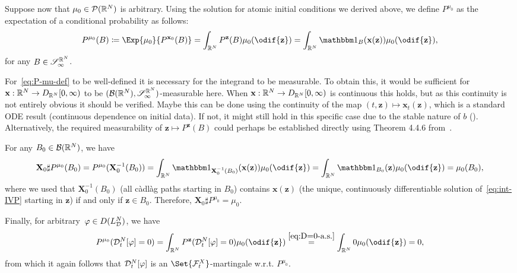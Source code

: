 Suppose now that \( \mu_0 \in \mathcal{P}(\mathbb{R}^N) \) is arbitrary.
Using the solution for atomic initial conditions we derived above, we define \( P^{\mu_0} \) as the expectation of a conditional probability as follows:
\begin{equation}\label{eq:P-mu-def}
  P^{\mu_0}(B) \coloneqq \Exp{\mu_0}{P^{\bm{x}_0}(B)}
  = \int_{\potspace^N} P^{\bm{z}}(B) \mu_0(\odif{\bm{z}})
  = \int_{\potspace^N} \indE{B}(\bm{x}(\bm{z})) \mu_0(\odif{\bm{z}}),
\end{equation}
for any \( B \in \mathscr{S}_\infty^{\mathbb{R}^N} \).

\begin{caveat}
  For~\eqref{eq:P-mu-def} to be well-defined it is necessary for the integrand to be measurable.
  To obtain this, it would be sufficient for \( \mathbf{x} : \mathbb{R}^N \to D_{\mathbb{R}^N}[0,\infty) \) to be \( (\mathcal{B}(\mathbb{R}^N), \mathscr{S}_\infty^{\mathbb{R}^N}) \)-measurable here.
  When \( \mathbf{x} : \mathbb{R}^N \to D_{\mathbb{R}^N}[0,\infty) \) is continuous this holds, but as this continuity is not entirely obvious it should be verified.
  Maybe this can be done using the continuity of the map \( (t, \bm{z}) \mapsto \bm{x}_t(\bm{z}) \), which is a standard ODE result (continuous dependence on initial data).
  If not, it might still hold in this specific case due to the stable nature of \( b \) ().
  Alternatively, the required measurability of \( \bm{z} \mapsto P^\bm{z}(B) \) could perhaps be established directly using Theorem 4.4.6 from~\cite{ethierMarkovProcessesCharacterization1986}.
\end{caveat}

For any \( B_0 \in \mathcal{B}(\mathbb{R}^N) \), we have
\begin{equation}
  \bm{X}_0 \sharp P^{\mu_0}(B_0) = P^{\mu_0}(\bm{X}_0^{-1} (B_0))
  = \int_{\potspace^N} \indE{\bm{X}_0^{-1} (B_0)}(\bm{x}(\bm{z})) \mu_0(\odif{\bm{z}})
  = \int_{\potspace^N} \indE{B_0}(\bm{z}) \mu_0(\odif{\bm{z}})
  = \mu_0(B_0),
\end{equation}
where we used that \( \bm{X}_0^{-1} (B_0) \) (all càdlàg paths starting in \( B_0 \)) contains \( \bm{x}(\bm{z}) \) (the unique, continuously differentiable solution of~\eqref{eq:int-IVP} starting in \( \bm{z} \)) if and only if \( \bm{z} \in B_0 \).
Therefore, \( \bm{X}_0 \sharp P^{\mu_0} = \mu_0 \).

Finally, for arbitrary~\(\varphi \in D(L_{\mathcal{D}}^N)\), we have
\begin{equation}
    P^{\mu_0}(\cD_t^{N}[\varphi] = 0)
    = \int_{\potspace^N} P^{\bm{z}}(\cD_t^{N}[\varphi] = 0) \mu_0(\odif{\bm{z}})
    \overset{\eqref{eq:D=0-a.s.}}{=} \int_{\potspace^N} 0 \mu_0(\odif{\bm{z}})
    = 0,
\end{equation}
from which it again follows that \(\mathcal{D}_t^{N}[\varphi]\) is an \(\Set{\cF_t^X}\)-martingale w.r.t. \( P^{\mu_0} \).

